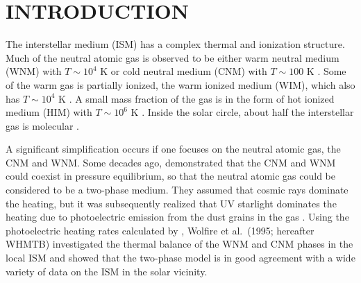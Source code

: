 \documentclass[12pt,preprint,flushrt]{aastex}
\begin{document}

\section{INTRODUCTION}

        The interstellar medium (ISM) has a complex
thermal and ionization structure.
Much of the neutral atomic gas is observed to
be either warm neutral medium (WNM)
with $T\sim 10^4$ K or cold neutral medium (CNM)
with $T\sim 100$ K \citep{kul87,dic90}.
Some of the warm gas is partially ionized,
the warm ionized medium (WIM), which
also has $T\sim 10^4$ K \citep{mck77,rey83,haf99}.
A small mass fraction of the gas is in the form of
hot ionized medium (HIM) with $T\sim 10^6$ K \citep{cox74,mck77}.
Inside the solar circle, about half the interstellar gas is
molecular \citep{sco87,bro88,bron00}.

        A significant simplification occurs if one focuses
on the neutral atomic gas,  the CNM and WNM.
Some decades ago, \cite{fie69} demonstrated that
the CNM and WNM could coexist in pressure equilibrium,
so that the neutral atomic gas could be considered to be
a two-phase medium.  They assumed that cosmic rays dominate
the heating, but it was subsequently realized that
UV starlight dominates the heating due to photoelectric
emission from the dust grains in the gas \citep{wat72}.
Using the photoelectric heating rates calculated by
\cite{bak94}, Wolfire et al.\ (1995; hereafter WHMTB)
investigated the thermal balance of the WNM and CNM phases
in the local ISM and showed
that the two-phase model is in good agreement
with a wide variety of data on the ISM in the solar vicinity.
\end{document}
